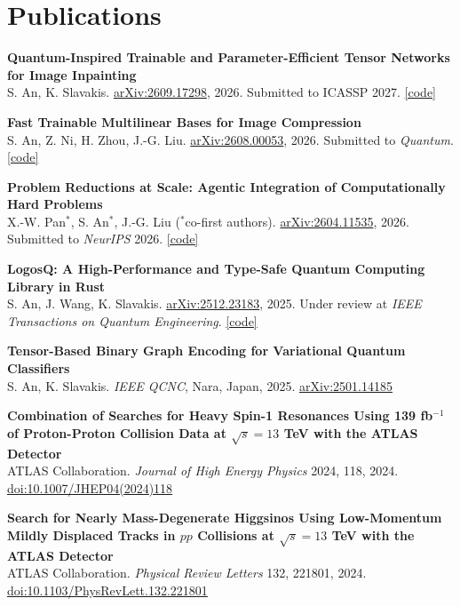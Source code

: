 \documentclass[a4paper,10pt]{article}
\begin{document}
\section*{Publications}

\textbf{Quantum-Inspired Trainable and Parameter-Efficient Tensor Networks for Image Inpainting} \\
\textcolor{textgray}{S. An, K. Slavakis. \href{https://arxiv.org/abs/2609.17298}{arXiv:2609.17298}, 2026. Submitted to ICASSP 2027. \href{https://github.com/zazabap/pdft}{[code]}}

\textbf{Fast Trainable Multilinear Bases for Image Compression} \\
\textcolor{textgray}{S. An, Z. Ni, H. Zhou, J.-G. Liu. \href{https://arxiv.org/abs/2608.00053}{arXiv:2608.00053}, 2026. Submitted to \textit{Quantum}. \href{https://github.com/zazabap/pdft}{[code]}}

\textbf{Problem Reductions at Scale: Agentic Integration of Computationally Hard Problems} \\
\textcolor{textgray}{X.-W. Pan$^*$, S. An$^*$, J.-G. Liu ($^*$co-first authors). \href{https://arxiv.org/abs/2604.11535}{arXiv:2604.11535}, 2026. Submitted to \textit{NeurIPS} 2026. \href{https://github.com/CodingThrust/problem-reductions}{[code]}}

\textbf{LogosQ: A High-Performance and Type-Safe Quantum Computing Library in Rust} \\
\textcolor{textgray}{S. An, J. Wang, K. Slavakis. \href{https://arxiv.org/abs/2512.23183}{arXiv:2512.23183}, 2025. Under review at \textit{IEEE Transactions on Quantum Engineering}. \href{https://github.com/zazabap/LogosQ}{[code]}}

\textbf{Tensor-Based Binary Graph Encoding for Variational Quantum Classifiers} \\
\textcolor{textgray}{S. An, K. Slavakis. \textit{IEEE QCNC}, Nara, Japan, 2025. \href{https://arxiv.org/abs/2501.14185}{arXiv:2501.14185}}

\textbf{Combination of Searches for Heavy Spin-1 Resonances Using 139 fb$^{-1}$ of Proton-Proton Collision Data at $\sqrt{s} = 13$ TeV with the ATLAS Detector} \\
\textcolor{textgray}{ATLAS Collaboration. \textit{Journal of High Energy Physics} 2024, 118, 2024. \href{https://doi.org/10.1007/JHEP04(2024)118}{doi:10.1007/JHEP04(2024)118}}

\textbf{Search for Nearly Mass-Degenerate Higgsinos Using Low-Momentum Mildly Displaced Tracks in $pp$ Collisions at $\sqrt{s} = 13$ TeV with the ATLAS Detector} \\
\textcolor{textgray}{ATLAS Collaboration. \textit{Physical Review Letters} 132, 221801, 2024. \href{http://dx.doi.org/10.1103/PhysRevLett.132.221801}{doi:10.1103/PhysRevLett.132.221801}}
\end{document}
